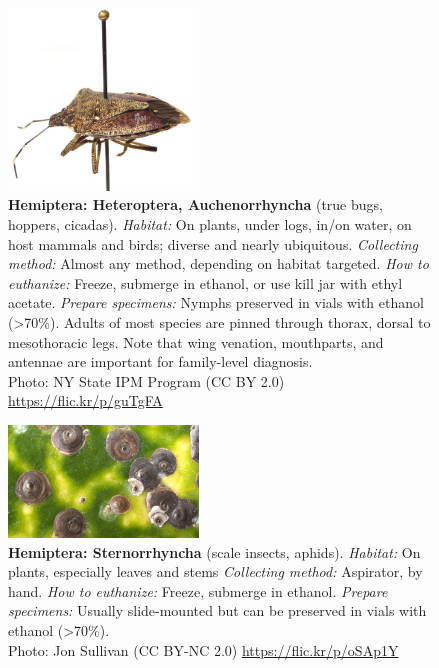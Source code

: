 \documentclass[letterpaper, 11pt]{article}
\begin{document}
\begin{figure}
  \caption*{\textbf{Hemiptera: Heteroptera, Auchenorrhyncha} (true bugs, hoppers, cicadas). \textit{Habitat:} On plants, under logs, in/on water, on host mammals and birds; diverse and nearly ubiquitous. \textit{Collecting method:} Almost any method, depending on habitat targeted. \textit{How to euthanize:} Freeze, submerge in ethanol, or use kill jar with ethyl acetate. \textit{Prepare specimens:} Nymphs preserved in vials with ethanol (\textgreater70\%). Adults of most species are pinned through thorax, dorsal to mesothoracic legs. Note that wing venation, mouthparts, and antennae are important for family-level diagnosis.\\ Photo: NY State IPM Program (CC BY 2.0) \url{https://flic.kr/p/guTgFA}}
  \includegraphics[width=0.45\textwidth]{HemipteraHeteroptera}
\end{figure}

\clearpage

\begin{figure}
  \caption*{\textbf{Hemiptera: Sternorrhyncha} (scale insects, aphids). \textit{Habitat:} On plants, especially leaves and stems \textit{Collecting method:} Aspirator, by hand. \textit{How to euthanize:} Freeze, submerge in ethanol. \textit{Prepare specimens:} Usually slide-mounted but can be preserved in vials with ethanol (\textgreater70\%).\\ Photo: Jon Sullivan (CC BY-NC 2.0) \url{https://flic.kr/p/oSAp1Y}}
  \includegraphics[width=0.45\textwidth]{HemipteraSternorrhyncha}
\end{figure}
\end{document}
